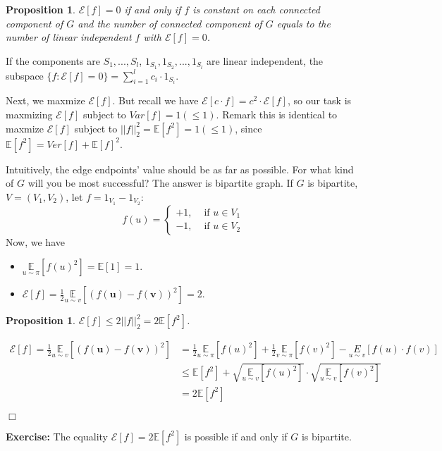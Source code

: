 \documentclass{article}
\newtheorem{proposition}[theorem]{Proposition}
\newenvironment{proof}{\noindent{\bf Proof:} \hspace*{1mm}}{
	\hspace*{\fill} $\Box$ }
\begin{document}
\begin{proposition}
  $\mathcal{E}[f] = 0$ if and only if $f$ is constant on each connected component of $G$ and the number of connected component of $G$ equals to the number of linear independent $f$ with $\mathcal{E}[f] = 0$.
\end{proposition}
If the components are $S_1, ..., S_l$, $1_{S_1}, 1_{S_2},...,1_{S_l}$ are linear independent, the subspace $\{f: \mathcal{E}[f]=0\} = \sum_{i=1}^{l} c_i \cdot 1_{S_i}$.
\par Next, we maxmize $\mathcal{E}[f]$. But recall we have $\mathcal{E}[c \cdot f] = c^2 \cdot \mathcal{E}[f]$, so our task is maxmizing $\mathcal{E}[f]$ subject to $Var[f] = 1 (\leq 1)$. Remark this is identical to maxmize $\mathcal{E}[f]$ subject to $||f||_2^2 = \mathbb{E}[f^2] = 1 (\leq 1)$, since $\mathbb{E}[f^2] = Ver[f] + \mathbb{E}[f]^2$.
\par Intuitively, the edge endpoints' value should be as far as possible. For what kind of $G$ will you be most successful? The answer is bipartite graph. If $G$ is bipartite, $V=(V_1, V_2)$, let $f=1_{V_1} - 1_{V_2}$:
$$
f(u)=\left\{
  \begin{array}{ll}
  +1, & \text { if } u \in V_1 \\
  -1, & \text { if } u \in V_2
  \end{array}
  \right.
$$
Now, we have
\begin{itemize}
  \item $\underset{u \sim \pi}{\mathbb{E}}[f(u)^2] = \mathbb{E}[1] = 1$.
  \item $\mathcal{E}[f] =\frac{1}{2} \underset{u \sim v}{\mathbb{E}}\left[(f(\boldsymbol{u})-f(\boldsymbol{v}))^{2}\right] = 2$.
\end{itemize}
\begin{proposition}
  $\mathcal{E}[f] \leq 2 ||f||_2^2 = 2 \mathbb{E}[f^2]$.
\end{proposition}
\begin{proof}
  \begin{align*}
    \mathcal{E}[f] =\frac{1}{2} \underset{u \sim v}{\mathbb{E}}\left[(f(\boldsymbol{u})-f(\boldsymbol{v}))^{2}\right] &= \frac{1}{2} \underset{u \sim \pi}{\mathbb{E}}[f(u)^2] + \frac{1}{2} \underset{v \sim \pi}{\mathbb{E}}[f(v)^2] - \underset{u \sim v}{E} [f(u) \cdot f(v)]\\
    & \leq \mathbb{E}[f^2] + \sqrt{\underset{u \sim v}{\mathbb{E}}[f(u)^2]} \cdot \sqrt{\underset{u \sim v}{\mathbb{E}}[f(v)^2]}\\
    &= 2 \mathbb{E}[f^2]
  \end{align*}
\end{proof}
\par \textbf{Exercise:} The equality $\mathcal{E}[f] = 2 \mathbb{E}[f^2]$ is possible if and only if $G$ is bipartite.

\end{document}
